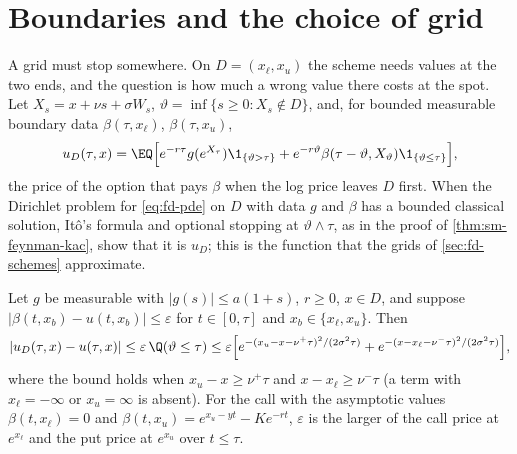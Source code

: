 \section{Boundaries and the choice of grid}\label{sec:fd-boundary}

A grid must stop somewhere. On $D=(x_\ell,x_u)$ the scheme needs values at the two ends, and the
question is how much a wrong value there costs at the spot. Let $X_s=x+\nu s+\sigma W_s$,
$\vartheta=\inf\{s\ge0:X_s\notin D\}$, and, for bounded measurable boundary data $\beta(\tau,x_\ell)$, $\beta(\tau,x_u)$,
\begin{equation}\label{eq:fd-dirichlet}
  u_D(\tau,x)=\EQ\Big[e^{-r\tau}g(e^{X_\tau})\1_{\{\vartheta>\tau\}}+e^{-r\vartheta}\beta(\tau-\vartheta,X_\vartheta)\1_{\{\vartheta\le\tau\}}\Big],
\end{equation}
the price of the option that pays $\beta$ when the log price leaves $D$ first. When the Dirichlet
problem for \eqref{eq:fd-pde} on $D$ with data $g$ and $\beta$ has a bounded classical solution, Itô's
formula and optional stopping at $\vartheta\wedge\tau$, as in the proof of \cref{thm:sm-feynman-kac}, show that it is
$u_D$; this is the function that the grids of \cref{sec:fd-schemes} approximate.

\begin{proposition}\label{prop:fd-boundary}
Let $g$ be measurable with $|g(s)|\le a(1+s)$, $r\ge0$, $x\in D$, and suppose
$|\beta(t,x_b)-u(t,x_b)|\le\varepsilon$ for $t\in[0,\tau]$ and $x_b\in\{x_\ell,x_u\}$. Then
\[
  |u_D(\tau,x)-u(\tau,x)|\le\varepsilon\,\Q(\vartheta\le\tau)
  \le\varepsilon\Big[e^{-(x_u-x-\nu^+\tau)^2/(2\sigma^2\tau)}+e^{-(x-x_\ell-\nu^-\tau)^2/(2\sigma^2\tau)}\Big],
\]
where the bound holds when $x_u-x\ge\nu^+\tau$ and $x-x_\ell\ge\nu^-\tau$ (a term with $x_\ell=-\infty$ or
$x_u=\infty$ is absent). For the call with the asymptotic values $\beta(t,x_\ell)=0$ and
$\beta(t,x_u)=e^{x_u-yt}-Ke^{-rt}$, $\varepsilon$ is the larger of the call price at $e^{x_\ell}$ and the put price at
$e^{x_u}$ over $t\le\tau$.
\end{proposition}

